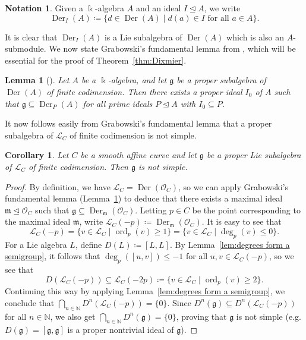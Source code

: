 \documentclass[12pt]{amsart}
\theoremstyle{plain}
\newtheorem{lemma}[theorem]{Lemma}
\newtheorem{corollary}[theorem]{Corollary}
\theoremstyle{definition}
\newtheorem{notation}[theorem]{Notation}
\numberwithin{equation}{section}
\def\g{\mathfrak{g}}
\def\L{\mathcal{L}}
\def\O{\mathcal{O}}
\def\NN{\mathbb{N}}
\def\kk{\Bbbk}
\DeclareMathOperator{\Der}{Der}
\DeclareMathOperator{\ord}{ord}
\def\ideal{\unlhd}
\begin{document}
\begin{notation}
    Given a $\kk$-algebra $A$ and an ideal $I \ideal A$, we write
    $$\Der_I(A) \coloneqq \{d \in \Der(A) \mid d(a) \in I \text{ for all } a \in A\}.$$
\end{notation}

It is clear that $\Der_I(A)$ is a Lie subalgebra of $\Der(A)$ which is also an $A$-submodule. We now state Grabowski's fundamental lemma from \cite{Grabowski}, which will be essential for the proof of Theorem~\ref{thm:Dixmier}.

\begin{lemma}[{\cite[Fundamental Lemma]{Grabowski}}]\label{lem:fundamental}
    Let $A$ be a $\kk$-algebra, and let $\g$ be a proper subalgebra of $\Der(A)$ of finite codimension. Then there exists a proper ideal $I_0$ of $A$ such that $\g \subseteq \Der_P(A)$ for all prime ideals $P \ideal A$ with $I_0 \subseteq P$.
\end{lemma}

It now follows easily from Grabowski's fundamental lemma that a proper subalgebra of $\L_C$ of finite codimension is not simple.

\begin{corollary}\label{cor:proper subalgebra not simple}
    Let $C$ be a smooth affine curve and let $\g$ be a proper Lie subalgebra of $\L_C$ of finite codimension. Then $\g$ is not simple.
\end{corollary}
\begin{proof}
    By definition, we have $\L_C = \Der(\O_C)$, so we can apply Grabowski's fundamental lemma (Lemma~\ref{lem:fundamental}) to deduce that there exists a maximal ideal $\mathfrak{m} \ideal \O_C$ such that $\g \subseteq \Der_{\mathfrak{m}}(\O_C)$. Letting $p \in C$ be the point corresponding to the maximal ideal $\mathfrak{m}$, write $\L_C(-p) \coloneqq \Der_{\mathfrak{m}}(\O_C)$. It is easy to see that
    $$\L_C(-p) = \{v \in \L_C \mid \ord_p(v) \geq 1\} = \{v \in \L_C \mid \deg_p(v) \leq 0\}.$$
    For a Lie algebra $L$, define $D(L) \coloneqq [L,L]$. By Lemma~\ref{lem:degrees form a semigroup}, it follows that $\deg_p([u,v]) \leq -1$ for all $u,v \in \L_C(-p)$, so we see that
    $$D(\L_C(-p)) \subseteq \L_C(-2p) \coloneqq \{v \in \L_C \mid \ord_p(v) \geq 2\}.$$
    Continuing this way by applying Lemma~\ref{lem:degrees form a semigroup}, we conclude that $\bigcap_{n \in \NN} D^n(\L_C(-p)) = \{0\}$. Since $D^n(\g) \subseteq D^n(\L_C(-p))$ for all $n \in \NN$, we also get $\bigcap_{n \in \NN} D^n(\g) = \{0\}$, proving that $\g$ is not simple (e.g. $D(\g) = [\g,\g]$ is a proper nontrivial ideal of $\g$).
\end{proof}
\end{document}
